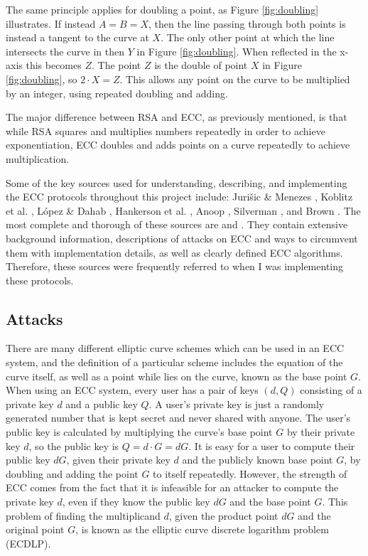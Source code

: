 \documentclass[12pt,a4paper]{article}
\begin{document}
The same principle applies for doubling a point, as Figure \ref{fig:doubling} illustrates. 
If instead $A = B = X$, then the line passing through both points is instead a tangent to the curve at $X$. 
The only other point at which the line intersects the curve in then $Y$ in Figure \ref{fig:doubling}. 
When reflected in the x-axis this becomes $Z$. 
The point $Z$ is the double of point $X$ in Figure \ref{fig:doubling}, so $2 \cdot X = Z$. 
This allows any point on the curve to be multiplied by an integer, using repeated doubling and adding. 

The major difference between RSA and ECC, as previously mentioned, 
is that while RSA squares and multiplies numbers repeatedly in order to achieve exponentiation, 
ECC doubles and adds points on a curve repeatedly to achieve multiplication. 

Some of the key sources used for understanding, describing, and implementing the ECC protocols throughout this project include: 
Juri\v sic \& Menezes \citeyear{jurivsic1997elliptic}, Koblitz et al. \citeyear{koblitz2000state}, L\' opez \& Dahab \citeyear{lopez2000overview}, Hankerson et al. \citeyear{hankerson2003guide}, Anoop \citeyear{anoop2007elliptic}, Silverman \citeyear{silverman2009arithmetic}, and Brown \citeyear{brown2009standards}. 
The most complete and thorough of these sources are \cite{hankerson2003guide} and \cite{silverman2009arithmetic}. 
They contain extensive background information, descriptions of attacks on ECC and ways to circumvent them with implementation details, as well as clearly defined ECC algorithms. 
Therefore, these sources were frequently referred to when I was implementing these protocols. 


\subsection{Attacks} \noindent
There are many different elliptic curve schemes which can be used in an ECC system, 
and the definition of a particular scheme includes the equation of the curve itself, 
as well as a point while lies on the curve, known as the base point $G$. 
When using an ECC system, every user has a pair of keys $(d,Q)$ consisting of a private key $d$ and a public key $Q$. 
A user's private key is just a randomly generated number that is kept secret and never shared with anyone. 
The user's public key is calculated by multiplying the curve's base point $G$ by their private key $d$, so the public key is $Q = d \cdot G = dG$. 
It is easy for a user to compute their public key $dG$, given their private key $d$ and the publicly known base point $G$, 
by doubling and adding the point $G$ to itself repeatedly. 
However, the strength of ECC comes from the fact that it is infeasible for an attacker to compute the private key $d$, even if they know the public key $dG$ and the base point $G$. 
This problem of finding the multiplicand $d$, given the product point $dG$ and the original point $G$, 
is known as the elliptic curve discrete logarithm problem (ECDLP). 
\end{document}
